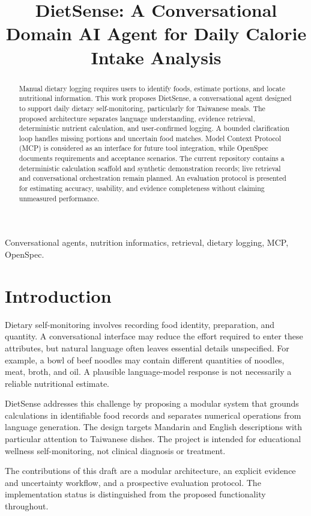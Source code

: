 \documentclass[conference]{IEEEtran}
\title{DietSense: A Conversational Domain AI Agent for Daily Calorie Intake Analysis}
\author{\IEEEauthorblockN{Author Name}\IEEEauthorblockA{National Taiwan Ocean University\\Taiwan}}
\begin{document}
\maketitle
\begin{abstract}
Manual dietary logging requires users to identify foods, estimate portions, and locate nutritional information. This work proposes DietSense, a conversational agent designed to support daily dietary self-monitoring, particularly for Taiwanese meals. The proposed architecture separates language understanding, evidence retrieval, deterministic nutrient calculation, and user-confirmed logging. A bounded clarification loop handles missing portions and uncertain food matches. Model Context Protocol (MCP) is considered as an interface for future tool integration, while OpenSpec documents requirements and acceptance scenarios. The current repository contains a deterministic calculation scaffold and synthetic demonstration records; live retrieval and conversational orchestration remain planned. An evaluation protocol is presented for estimating accuracy, usability, and evidence completeness without claiming unmeasured performance.
\end{abstract}
\begin{IEEEkeywords}
Conversational agents, nutrition informatics, retrieval, dietary logging, MCP, OpenSpec.
\end{IEEEkeywords}
\section{Introduction}
Dietary self-monitoring involves recording food identity, preparation, and quantity. A conversational interface may reduce the effort required to enter these attributes, but natural language often leaves essential details unspecified. For example, a bowl of beef noodles may contain different quantities of noodles, meat, broth, and oil. A plausible language-model response is not necessarily a reliable nutritional estimate.

DietSense addresses this challenge by proposing a modular system that grounds calculations in identifiable food records and separates numerical operations from language generation. The design targets Mandarin and English descriptions with particular attention to Taiwanese dishes. The project is intended for educational wellness self-monitoring, not clinical diagnosis or treatment.

The contributions of this draft are a modular architecture, an explicit evidence and uncertainty workflow, and a prospective evaluation protocol. The implementation status is distinguished from the proposed functionality throughout.
\end{document}
